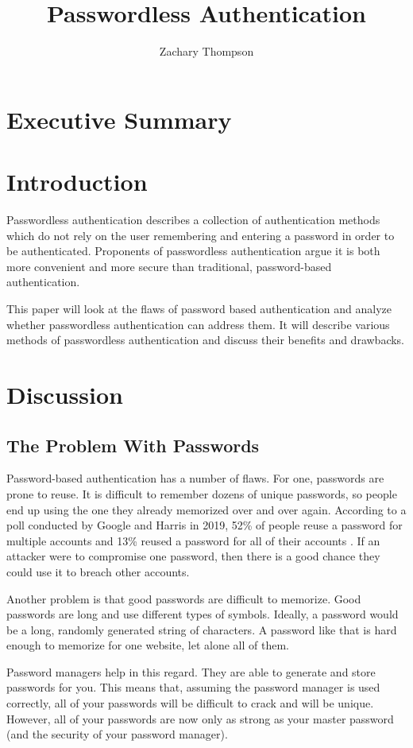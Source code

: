 \documentclass[12pt, letterpaper]{article}
\title{Passwordless Authentication}
\author{Zachary Thompson}
\begin{document}
\maketitle

\section{Executive Summary}
\section{Introduction}
Passwordless authentication describes a collection of authentication methods which do not rely on the user remembering and entering a password in order to be authenticated.
Proponents of passwordless authentication argue it is both more convenient and more secure than traditional, password-based authentication.

This paper will look at the flaws of password based authentication and analyze whether passwordless authentication can address them.
It will describe various methods of passwordless authentication and discuss their benefits and drawbacks.
\section{Discussion}
\subsection{The Problem With Passwords}
Password-based authentication has a number of flaws.
For one, passwords are prone to reuse.
It is difficult to remember dozens of unique passwords, so people end up using the one they already memorized over and over again.
According to a poll conducted by Google and Harris in 2019, 52\% of people reuse a password for multiple accounts and 13\% reused a password for all of their accounts \parencite{googleharris2019poll}.
If an attacker were to compromise one password, then there is a good chance they could use it to breach other accounts.

Another problem is that good passwords are difficult to memorize.
Good passwords are long and use different types of symbols.
Ideally, a password would be a long, randomly generated string of characters.
A password like that is hard enough to memorize for one website, let alone all of them.

Password managers help in this regard.
They are able to generate and store passwords for you.
This means that, assuming the password manager is used correctly, all of your passwords will be difficult to crack and will be unique. 
However, all of your passwords are now only as strong as your master password (and the security of your password manager).
\end{document}
